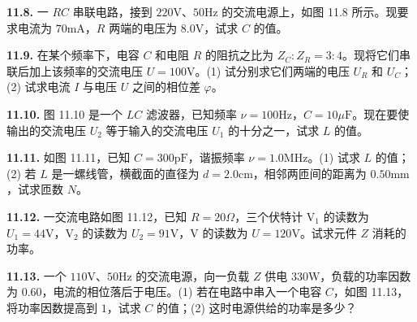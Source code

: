 \vfill
\newpage

\textbf{11.8.} 一 $RC$ 串联电路，接到 $220\mathrm{V}$、$50\mathrm{Hz}$ 的交流电源上，如图 11.8 所示。现要求电流为 $70\mathrm{mA}$，$R$ 两端的电压为 $8.0\mathrm{V}$，试求 $C$ 的值。

\begin{center}
\end{center}

\vfill
\newpage

\textbf{11.9.} 在某个频率下，电容 $C$ 和电阻 $R$ 的阻抗之比为 $Z_{C}:Z_{R} = 3:4$。现将它们串联后加上该频率的交流电压 $U = 100\mathrm{V}$。(1) 试分别求它们两端的电压 $U_{R}$ 和 $U_{C}$；(2) 试求电流 $I$ 与电压 $U$ 之间的相位差 $\varphi$。

\vfill
\newpage

\textbf{11.10.} 图 11.10 是一个 $LC$ 滤波器，已知频率 $\nu = 100\mathrm{Hz}$，$C = 10\mu\mathrm{F}$。现在要使输出的交流电压 $U_{2}$ 等于输入的交流电压 $U_{1}$ 的十分之一，试求 $L$ 的值。

\begin{center}
\end{center}

\vfill
\newpage

\textbf{11.11.} 如图 11.11，已知 $C = 300\mathrm{pF}$，谐振频率 $\nu = 1.0\mathrm{MHz}$。(1) 试求 $L$ 的值；(2) 若 $L$ 是一螺线管，横截面的直径为 $d = 2.0\mathrm{cm}$，相邻两匝间的距离为 $0.50\mathrm{mm}$，试求匝数 $N$。

\begin{center}
\end{center}

\vfill
\newpage

\textbf{11.12.} 一交流电路如图 11.12，已知 $R = 20\Omega$，三个伏特计 $\mathrm{V}_1$ 的读数为 $U_1 = 44\mathrm{V}$，$\mathrm{V}_2$ 的读数为 $U_2 = 91\mathrm{V}$，$\mathrm{V}$ 的读数为 $U = 120\mathrm{V}$。试求元件 $Z$ 消耗的功率。

\begin{center}
\end{center}

\vfill
\newpage

\textbf{11.13.} 一个 $110\mathrm{V}$、$50\mathrm{Hz}$ 的交流电源，向一负载 $Z$ 供电 $330\mathrm{W}$，负载的功率因数为 $0.60$，电流的相位落后于电压。(1) 若在电路中串入一个电容 $C$，如图 11.13，将功率因数提高到 $1$，试求 $C$ 的值；(2) 这时电源供给的功率是多少？

